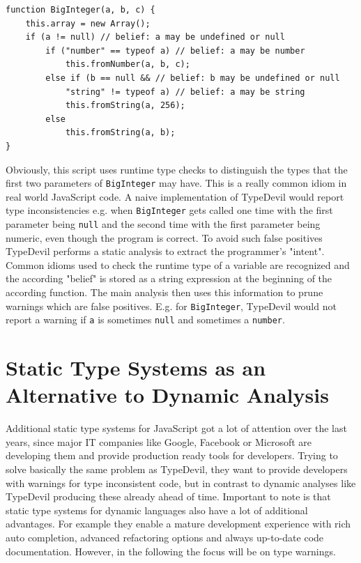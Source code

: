 \documentclass[runningheads,a4paper]{llncs}
\begin{document}
\medskip\medskip
\lstset{language=javascript}
\begin{minipage}{\linewidth}
\begin{lstlisting}[frame=single, caption=Pruning via Belief Analysis, label={lst:BeliefAnalysis}]
function BigInteger(a, b, c) { 
    this.array = new Array();
    if (a != null) // belief: a may be undefined or null
        if ("number" == typeof a) // belief: a may be number
            this.fromNumber(a, b, c);
        else if (b == null && // belief: b may be undefined or null
            "string" != typeof a) // belief: a may be string
            this.fromString(a, 256); 
        else  
            this.fromString(a, b);
}
\end{lstlisting}
\end{minipage}
Obviously, this script uses runtime type checks to distinguish the types that the first two parameters of \lstinline[columns=fixed]{BigInteger} may have.
This is a really common idiom in real world JavaScript code.
A naive implementation of TypeDevil would report type inconsistencies e.g. when \lstinline[columns=fixed]{BigInteger} gets called one time with the first parameter being \lstinline[columns=fixed]{null} and the second time with the first parameter being numeric, even though the program is correct. 
To avoid such false positives TypeDevil performs a static analysis to extract the programmer’s "intent".
Common idioms used to check the runtime type of a variable are recognized and the according "belief" is stored as a string expression at the beginning of the according function.
The main analysis then uses this information to prune warnings which are false positives.
E.g. for \lstinline[columns=fixed]{BigInteger}, TypeDevil would not report a warning if \lstinline[columns=fixed]{a} is sometimes \lstinline[columns=fixed]{null} and sometimes a \lstinline[columns=fixed]{number}.

\section{Static Type Systems as an Alternative to Dynamic Analysis}

Additional static type systems for JavaScript got a lot of attention over the last years, since major IT companies like Google, Facebook or Microsoft are developing them and provide production ready tools for developers.
Trying to solve basically the same problem as TypeDevil, they want to provide developers with warnings for type inconsistent code, but in contrast to dynamic analyses like TypeDevil producing these already ahead of time.
Important to note is that static type systems for dynamic languages also have a lot of additional advantages.
For example they enable a mature development experience with rich auto completion, advanced refactoring options and always up-to-date code documentation.
However, in the following the focus will be on type warnings.
\end{document}
